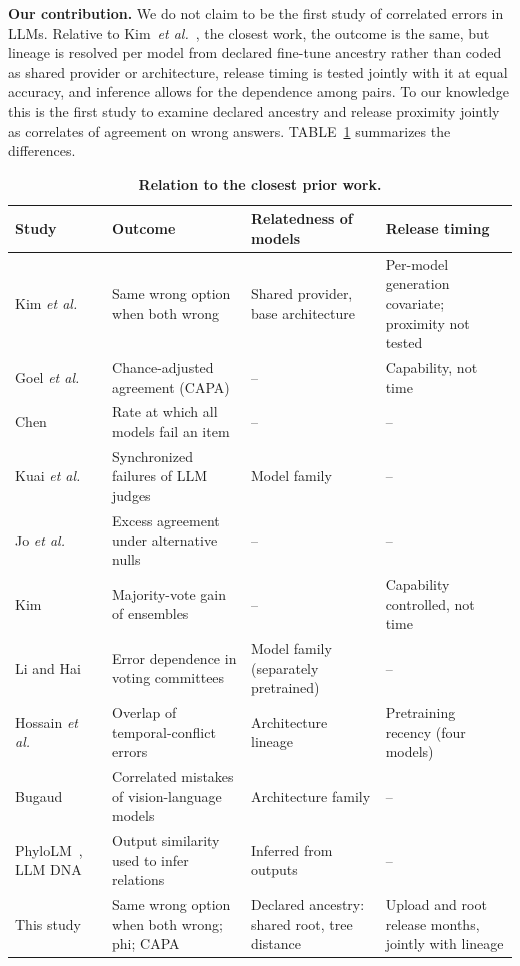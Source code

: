 \documentclass{ieeeaccess}
\theoremstyle{definition}
\theoremstyle{plain}
\begin{document}
\textbf{Our contribution.} We do not claim to be the first study of correlated errors in LLMs. Relative to Kim~\textit{et al.}~\cite{kim2025}, the closest work, the outcome is the same, but lineage is resolved per model from declared fine-tune ancestry rather than coded as shared provider or architecture, release timing is tested jointly with it at equal accuracy, and inference allows for the dependence among pairs. To our knowledge this is the first study to examine declared ancestry and release proximity jointly as correlates of agreement on wrong answers. TABLE~\ref{tab:prior} summarizes the differences.

\begin{table}[!t]
\caption{\textbf{Relation to the closest prior work.}}
\label{tab:prior}
\centering
\footnotesize
\begin{tabular}{p{}p{}p{}p{}}
\toprule
Study & Outcome & Relatedness of models & Release timing \\
\midrule
Kim \textit{et al.}~\cite{kim2025} & Same wrong option when both wrong & Shared provider, base architecture & Per-model generation covariate; proximity not tested \\
Goel \textit{et al.}~\cite{goel2025} & Chance-adjusted agreement (CAPA) & -- & Capability, not time \\
Chen~\cite{chen2026} & Rate at which all models fail an item & -- & -- \\
Kuai \textit{et al.}~\cite{kuai2026} & Synchronized failures of LLM judges & Model family & -- \\
Jo \textit{et al.}~\cite{jo2026} & Excess agreement under alternative nulls & -- & -- \\
Kim~\cite{kimd2026} & Majority-vote gain of ensembles & -- & Capability controlled, not time \\
Li and Hai~\cite{lihai2026} & Error dependence in voting committees & Model family (separately pretrained) & -- \\
Hossain \textit{et al.}~\cite{hossain2026} & Overlap of temporal-conflict errors & Architecture lineage & Pretraining recency (four models) \\
Bugaud~\cite{bugaud2026} & Correlated mistakes of vision-language models & Architecture family & -- \\
PhyloLM~\cite{phylolm2024}, LLM DNA~\cite{wu2026dna} & Output similarity used to infer relations & Inferred from outputs & -- \\
This study & Same wrong option when both wrong; phi; CAPA & Declared ancestry: shared root, tree distance & Upload and root release months, jointly with lineage \\
\bottomrule
\end{tabular}
\end{table}
\end{document}
